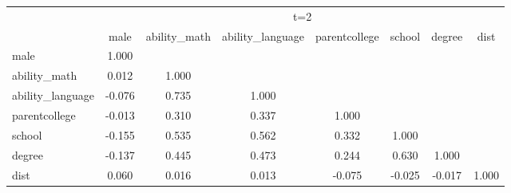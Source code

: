 \begin{tabular}{l*{7}{c}}
\hline\hline
            &\multicolumn{7}{c}{t=2}                                                                   \\
            &        male&ability\_math&ability\_language&parentcollege&      school&      degree&        dist\\
\hline
male        &       1.000&            &            &            &            &            &            \\
ability\_math&       0.012&       1.000&            &            &            &            &            \\
ability\_language&      -0.076&       0.735&       1.000&            &            &            &            \\
parentcollege&      -0.013&       0.310&       0.337&       1.000&            &            &            \\
school      &      -0.155&       0.535&       0.562&       0.332&       1.000&            &            \\
degree      &      -0.137&       0.445&       0.473&       0.244&       0.630&       1.000&            \\
dist        &       0.060&       0.016&       0.013&      -0.075&      -0.025&      -0.017&       1.000\\
\hline\hline
\end{tabular}
